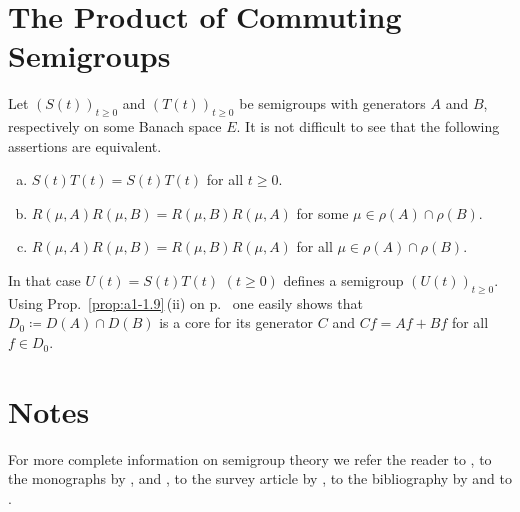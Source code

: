 \section{The Product of Commuting Semigroups}\label{sec:a1-3.8}
Let $(S(t))_{t\geq 0}$ and $(T(t))_{t\geq 0}$ be semigroups with generators $A$ and $B$, respectively on some Banach space $E$.
It is not difficult to see that the following assertions are equivalent.
\begin{enumerate}[(a), leftmargin=2em]

\item 
$S(t)T(t) = S(t)T(t)$ for all $t \geq 0$.

\item 
$R(\mu,A)R(\mu,B) = R(\mu,B)R(\mu,A)$ for some $\mu \in \rho(A) \cap \rho(B)$.

\item 
$R(\mu,A)R(\mu,B) = R(\mu,B)R(\mu,A)$ for all $\mu \in \rho(A) \cap \rho(B)$.

\end{enumerate}
In that case $U(t) = S(t)T(t)$ $(t \geq 0)$ defines a semigroup $(U(t))_{t\geq 0}$.
Using %
Prop.~\ref{prop:a1-1.9}\,(ii) on p.~\pageref{prop:a1-1.9} 
one easily shows that $D_{0} \coloneqq D(A) \cap D(B)$ is a core for its generator $C$ and $Cf = Af + Bf$ for all $f \in D_{0}$.

\section*{Notes}

For more complete information on semigroup theory we refer the reader to \citet{hillephillips:1957}, to the monographs by \citet{davies:1980}, 
\citet{goldstein:1985a} and \citet{pazy:1983}, to the survey article by \citet{kreinkhazan:1985}, to the bibliography by 
\citet{goldstein:1985b} and to \citet{engelnagel:2006}.


